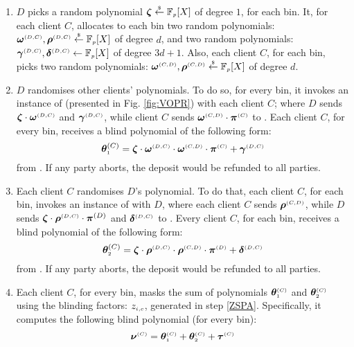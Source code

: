 \begin{enumerate}[leftmargin=4mm]
\item  $D$ picks a  random polynomial $\bm\zeta \stackrel{\scriptscriptstyle\$}\leftarrow \mathbb{F}_{\scriptscriptstyle p}[X]$ of degree $1$, for each bin.  
It, for each client $C$, allocates to each bin two random polynomials: $\bm\omega^{\scriptscriptstyle(D,C)}, \bm\rho^{\scriptscriptstyle (D,C)}\stackrel{\scriptscriptstyle\$}\leftarrow \mathbb{F}_{\scriptscriptstyle p}[X]$ of degree $d$, and  two  random polynomials: $\bm\gamma^{\scriptscriptstyle (D,C)}, \bm\delta^{\scriptscriptstyle (D,C)} \leftarrow \mathbb{F}_{\scriptscriptstyle p}[X]$ of degree $3d+1$. Also, each client $C$, for each bin, picks two  random polynomials: $\bm\omega^{\scriptscriptstyle (C,D)}, \bm\rho^{\scriptscriptstyle (C,D)}\stackrel{\scriptscriptstyle\$}\leftarrow \mathbb{F}_{\scriptscriptstyle p}[X]$ of degree $d$. %




\item\label{e-psi::D-randomises}  $D$ randomises other clients' polynomials. To do so, for every bin, it invokes an instance of {\vopr} (presented in Fig. \ref{fig:VOPR}) with  each client $  C$; where  $D$ sends $\bm\zeta \cdot \bm\omega^{\scriptscriptstyle  {  {(D,C)}}}$ and $\bm\gamma^{\scriptscriptstyle  {  {(D,C)}}}$, while client $ C$ sends $\bm\omega^{\scriptscriptstyle  {  {(C,D)}}}\cdot \bm\pi^{\scriptscriptstyle  {  {(C)}}}$ to {\vopr}. Each client $C$, for every bin, receives a blind polynomial of the following form: 
%
$$\bm\theta^{  {  {(C)}}}_{\scriptscriptstyle 1}=\bm\zeta \cdot \bm\omega^{\scriptscriptstyle  {  {(D,C)}}}\cdot \bm\omega^{\scriptscriptstyle  {  {(C,D)}}}\cdot \bm\pi^{\scriptscriptstyle  {  {(C)}}}+\bm\gamma^{\scriptscriptstyle  {  {(D,C)}}}$$
%
 from {\vopr}. If any party aborts, the deposit would be refunded to all parties.

\item\label{e-psi::C-randomises} Each client $    {  C}$ randomises  $ {D}$'s polynomial. To do that, each client $    {  C}$, for each bin,  invokes an instance of {\vopr} with   $ {D}$,    where each client $    {  C}$  sends $\bm\rho^{\scriptscriptstyle  {  {(C,D)}}}$, while  ${D}$  sends $\bm\zeta\cdot\bm \rho^{\scriptscriptstyle  {  {(D,C)}}}\cdot \bm\pi^{  {  {(D)}}}$ and $\bm\delta^{\scriptscriptstyle  {  {(D,C)}}}$ to {\vopr}. Every client   $    {  C}$, for each bin,  receives a blind polynomial of the following form: 
%
$$\bm\theta^{  {  {(C)}}}_{\scriptscriptstyle 2}=\bm\zeta \cdot \bm\rho^{\scriptscriptstyle  {  {(D,C)}}}\cdot \bm\rho^{\scriptscriptstyle  {  {(C,D)}}}\cdot \bm\pi^{\scriptscriptstyle  {  {(D)}}}+\bm\delta^{\scriptscriptstyle  {  {(D,C)}}}$$
 from {\vopr}. If any party aborts, the deposit would be refunded to all parties.


\item\label{blindPoly-C-sends-to-contract} Each client $ C$, for every bin, masks the sum of polynomials $\bm\theta^{\scriptscriptstyle  {  {(C)}}}_{\scriptscriptstyle 1}$ and $\bm\theta^{\scriptscriptstyle  {  {(C)}}}_{\scriptscriptstyle 2}$  using the blinding factors: $z_{\scriptscriptstyle i,c}$, generated in step \ref{ZSPA}. Specifically, it computes the following blind polynomial (for every bin):  
%
$$\bm\nu^{ \scriptscriptstyle {  {(C)}} }= \bm\theta^{ \scriptscriptstyle {  {(C)}}}_{\scriptscriptstyle 1}+\bm\theta^{\scriptscriptstyle  {  {(C)}}}_{\scriptscriptstyle 2}+\bm \tau^{\scriptscriptstyle  {  {(C)}} }$$


\end{enumerate}
